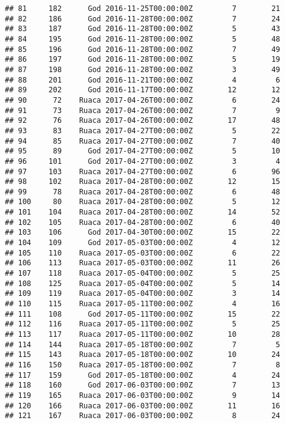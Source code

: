 \documentclass[
]{article}
\begin{document}
\begin{verbatim}
## 81     182      God 2016-11-25T00:00:00Z         7        21
## 82     186      God 2016-11-28T00:00:00Z         7        24
## 83     187      God 2016-11-28T00:00:00Z         5        43
## 84     195      God 2016-11-28T00:00:00Z         5        48
## 85     196      God 2016-11-28T00:00:00Z         7        49
## 86     197      God 2016-11-28T00:00:00Z         5        19
## 87     198      God 2016-11-28T00:00:00Z         3        49
## 88     201      God 2016-11-21T00:00:00Z         4         6
## 89     202      God 2016-11-17T00:00:00Z        12        12
## 90      72    Ruaca 2017-04-26T00:00:00Z         6        24
## 91      73    Ruaca 2017-04-26T00:00:00Z         7         9
## 92      76    Ruaca 2017-04-26T00:00:00Z        17        48
## 93      83    Ruaca 2017-04-27T00:00:00Z         5        22
## 94      85    Ruaca 2017-04-27T00:00:00Z         7        40
## 95      89      God 2017-04-27T00:00:00Z         5        10
## 96     101      God 2017-04-27T00:00:00Z         3         4
## 97     103    Ruaca 2017-04-27T00:00:00Z         6        96
## 98     102    Ruaca 2017-04-28T00:00:00Z        12        15
## 99      78    Ruaca 2017-04-28T00:00:00Z         6        48
## 100     80    Ruaca 2017-04-28T00:00:00Z         5        12
## 101    104    Ruaca 2017-04-28T00:00:00Z        14        52
## 102    105    Ruaca 2017-04-28T00:00:00Z         6        40
## 103    106      God 2017-04-30T00:00:00Z        15        22
## 104    109      God 2017-05-03T00:00:00Z         4        12
## 105    110    Ruaca 2017-05-03T00:00:00Z         6        22
## 106    113    Ruaca 2017-05-03T00:00:00Z        11        26
## 107    118    Ruaca 2017-05-04T00:00:00Z         5        25
## 108    125    Ruaca 2017-05-04T00:00:00Z         5        14
## 109    119    Ruaca 2017-05-04T00:00:00Z         3        14
## 110    115    Ruaca 2017-05-11T00:00:00Z         4        16
## 111    108      God 2017-05-11T00:00:00Z        15        22
## 112    116    Ruaca 2017-05-11T00:00:00Z         5        25
## 113    117    Ruaca 2017-05-11T00:00:00Z        10        28
## 114    144    Ruaca 2017-05-18T00:00:00Z         7         5
## 115    143    Ruaca 2017-05-18T00:00:00Z        10        24
## 116    150    Ruaca 2017-05-18T00:00:00Z         7         8
## 117    159      God 2017-05-18T00:00:00Z         4        24
## 118    160      God 2017-06-03T00:00:00Z         7        13
## 119    165    Ruaca 2017-06-03T00:00:00Z         9        14
## 120    166    Ruaca 2017-06-03T00:00:00Z        11        16
## 121    167    Ruaca 2017-06-03T00:00:00Z         8        24

\end{verbatim}
\end{document}
